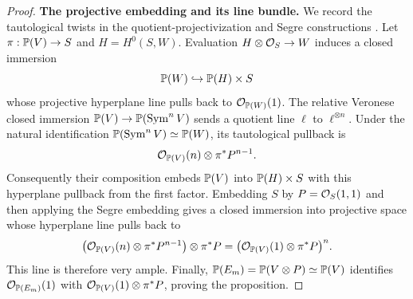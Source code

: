 \begin{proof}
\smallskip\noindent\textbf{The projective embedding and its line bundle.}
We record the tautological twists in the quotient-projectivization
and Segre constructions
\cite[Tags~01OA, 01N1, and~01WD]{StacksProject}.
Let $\pi:\mathbb P(V)\to S$ and $H=H^0(S,W)$. Evaluation
$H\otimes\mathcal O_S\to W$ induces a closed immersion
\[
 \mathbb P(W)\hookrightarrow\mathbb P(H)\times S
\]
whose projective hyperplane line pulls back to
$\mathcal O_{\mathbb P(W)}(1)$. The relative Veronese closed immersion
$\mathbb P(V)\to\mathbb P(\operatorname{Sym}^n V)$ sends a quotient line $\ell$ to
$\ell^{\otimes n}$. Under the natural identification
$\mathbb P(\operatorname{Sym}^n V)\simeq\mathbb P(W)$, its tautological pullback is
\[
 \mathcal O_{\mathbb P(V)}(n)\otimes\pi^*P^{n-1}.
\]
Consequently their composition embeds $\mathbb P(V)$ into
$\mathbb P(H)\times S$ with this hyperplane pullback from the first
factor. Embedding $S$ by $P=\mathcal O_S(1,1)$ and then applying the Segre
embedding gives a closed immersion into projective space whose
hyperplane line pulls back to
\[
 \bigl(\mathcal O_{\mathbb P(V)}(n)\otimes\pi^*P^{n-1}\bigr)
       \otimes\pi^*P
 =\bigl(\mathcal O_{\mathbb P(V)}(1)\otimes\pi^*P\bigr)^n.
\]
This line is therefore very ample. Finally,
$\mathbb P(E_m)=\mathbb P(V\otimes P)\simeq\mathbb P(V)$ identifies
$\mathcal O_{\mathbb P(E_m)}(1)$ with
$\mathcal O_{\mathbb P(V)}(1)\otimes\pi^*P$, proving the proposition.
\end{proof}
